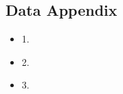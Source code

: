 \begin{appendix}
\section{Data Appendix}
\begin{itemize}
\item 1.
\item 2.
\item 3.
\end{itemize}
\end{appendix}